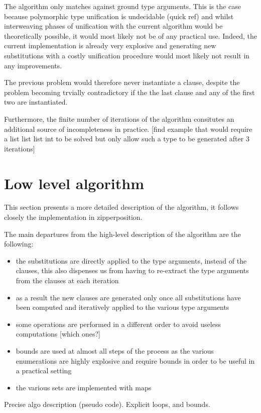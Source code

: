 \documentclass{article}
\begin{document}
The algorithm only matches against ground type arguments. This is the case because polymorphic type unification is undecidable (quick ref) and whilst interweaving phases of unification with the current algorithm would be theoretically possible, it would most likely not be of any practical use. Indeed, the current implementation is already very explosive and generating new substitutions with a costly unification procedure would most likely not result in any improvements.


The previous problem would therefore never instantiate a clause, despite the problem becoming trvially contradictory if the the last clause and any of the first two are instantiated.


Furthermore, the finite number of iterations of the algorithm consitutes an additional source of incompleteness in practice.
[find example that would require a list list list int to be solved but only allow such a type to be generated after 3 iterations]
\section{Low level algorithm}

This section presents a more detailed description of the algorithm, it follows closely the implementation in zipperposition.

The main departures from the high-level description of the algorithm are the following:
\begin{itemize}
   \item the substitutions are directly applied to the type arguments, instead of the clauses, this also dispenses us from having to re-extract the type arguments from the clauses at each iteration
   \item as a result the new clauses are generated only once all substitutions have been computed and iteratively applied to the various type arguments
   \item some operations are performed in a different order to avoid useless computations [which ones?]
   \item bounds are used at almost all steps of the process as the various enumerations are highly explosive and require bounds in order to be useful in a practical setting
   \item the various sets are implemented with maps
\end{itemize}

Precise algo description (pseudo code). Explicit loops, and bounds.
\end{document}
